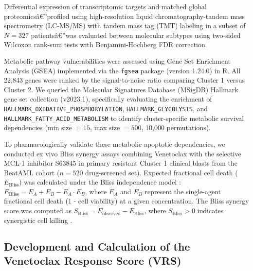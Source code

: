 \documentclass[11pt,a4paper]{article}
\begin{document}
Differential expression of transcriptomic targets and matched global proteomicsâ€”profiled using high-resolution liquid chromatography-tandem mass spectrometry (LC-MS/MS) with tandem mass tag (TMT) labeling in a subset of $N=327$ patientsâ€”was evaluated between molecular subtypes using two-sided Wilcoxon rank-sum tests with Benjamini-Hochberg FDR correction.

Metabolic pathway vulnerabilities were assessed using Gene Set Enrichment Analysis (GSEA) implemented via the \texttt{fgsea} package (version 1.24.0) in R. All 22,843 genes were ranked by the signal-to-noise ratio comparing Cluster 1 versus Cluster 2. We queried the Molecular Signatures Database (MSigDB) Hallmark gene set collection (v2023.1), specifically evaluating the enrichment of \texttt{HALLMARK\_OXIDATIVE\_PHOSPHORYLATION}, \texttt{HALLMARK\_GLYCOLYSIS}, and \texttt{HALLMARK\_FATTY\_ACID\_METABOLISM} to identify cluster-specific metabolic survival dependencies (min size $= 15$, max size $= 500$, 10,000 permutations). 

To pharmacologically validate these metabolic-apoptotic dependencies, we conducted ex vivo Bliss synergy assays combining Venetoclax with the selective MCL-1 inhibitor S63845 in primary resistant Cluster 1 clinical blasts from the BeatAML cohort ($n=520$ drug-screened set). Expected fractional cell death ($E_{\text{Bliss}}$) was calculated under the Bliss independence model \cite{bliss1939toxicity,greco1995search,foucquier2015analysis}: $E_{\text{Bliss}} = E_A + E_B - E_A \cdot E_B$, where $E_A$ and $E_B$ represent the single-agent fractional cell death (1 - cell viability) at a given concentration. The Bliss synergy score was computed as $S_{\text{Bliss}} = E_{\text{observed}} - E_{\text{Bliss}}$, where $S_{\text{Bliss}} > 0$ indicates synergistic cell killing \cite{ianevski2017synergyfinder}.

\subsection{Development and Calculation of the Venetoclax Response Score (VRS)} \label{sec:vrs_development}
\end{document}
